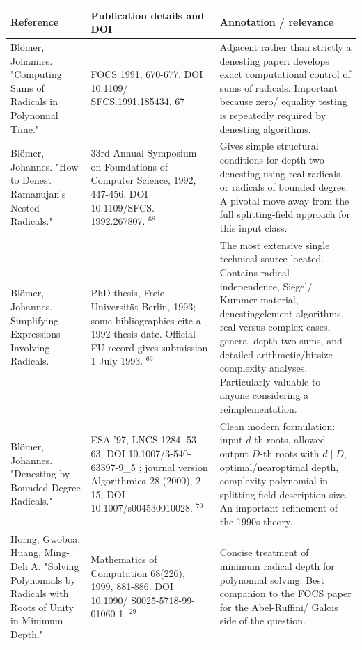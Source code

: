 \documentclass[10pt]{article}
\begin{document}
\begin{center}
\begin{tabular}[t]{|l|l|l|}
\hline
Reference & Publication details and DOI & Annotation / relevance \\
\hline
Blömer, Johannes. "Computing Sums of Radicals in Polynomial Time." & FOCS 1991, 670-677. DOI 10.1109/ SFCS.1991.185434. 67 & Adjacent rather than strictly a denesting paper: develops exact computational control of sums of radicals. Important because zero/ equality testing is repeatedly required by denesting algorithms. \\
\hline
Blömer, Johannes. "How to Denest Ramanujan's Nested Radicals." & 33rd Annual Symposium on Foundations of Computer Science, 1992, 447-456. DOI 10.1109/SFCS. 1992.267807. ${ }^{68}$ & Gives simple structural conditions for depth-two denesting using real radicals or radicals of bounded degree. A pivotal move away from the full splitting-field approach for this input class. \\
\hline
Blömer, Johannes. Simplifying Expressions Involving Radicals. & PhD thesis, Freie Universität Berlin, 1993; some bibliographies cite a 1992 thesis date. Official FU record gives submission 1 July 1993. ${ }^{69}$ & The most extensive single technical source located. Contains radical independence, Siegel/ Kummer material, denestingelement algorithms, real versus complex cases, general depth-two sums, and detailed arithmetic/bitsize complexity analyses. Particularly valuable to anyone considering a reimplementation. \\
\hline
Blömer, Johannes. "Denesting by Bounded Degree Radicals." & ESA '97, LNCS 1284, 53-63, DOI 10.1007/3-540-63397-9\_5 ; journal version Algorithmica 28 (2000), 2-15, DOI 10.1007/s004530010028. ${ }^{70}$ & Clean modern formulation: input $d$-th roots, allowed output $D$-th roots with $d \mid D$, optimal/nearoptimal depth, complexity polynomial in splitting-field description size. An important refinement of the 1990s theory. \\
\hline
Horng, Gwoboa; Huang, Ming-Deh A. "Solving Polynomials by Radicals with Roots of Unity in Minimum Depth." & Mathematics of Computation 68(226), 1999, 881-886. DOI 10.1090/ S0025-5718-99-01060-1. ${ }^{29}$ & Concise treatment of minimum radical depth for polynomial solving. Best companion to the FOCS paper for the Abel-Ruffini/ Galois side of the question. \\
\hline
\end{tabular}
\end{center}
\end{document}
